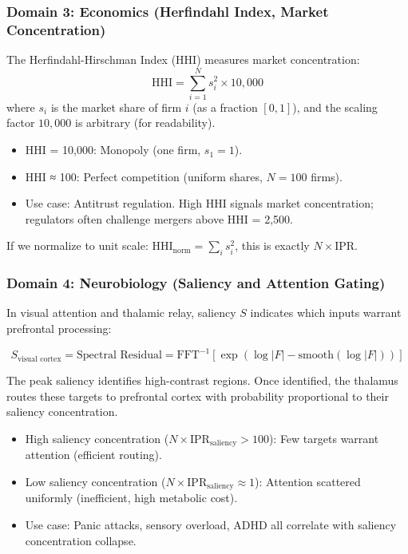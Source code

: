 \documentclass[11pt,oneside]{article}
\theoremstyle{definition}
\begin{document}
\subsubsection{Domain 3: Economics (Herfindahl Index, Market Concentration)}

The Herfindahl-Hirschman Index (HHI) measures market concentration:
\[
\text{HHI} = \sum_{i=1}^N s_i^2 \times 10,000
\]
where $s_i$ is the market share of firm $i$ (as a fraction $[0, 1]$), and the scaling factor $10,000$ is arbitrary (for readability).

\begin{itemize}
  \item HHI = 10,000: Monopoly (one firm, $s_1 = 1$).
  \item HHI ≈ 100: Perfect competition (uniform shares, $N = 100$ firms).
  \item Use case: Antitrust regulation. High HHI signals market concentration; regulators often challenge mergers above HHI = 2,500.
\end{itemize}

If we normalize to unit scale: $\text{HHI}_{\text{norm}} = \sum_i s_i^2$, this is exactly $N \times \text{IPR}$.

\subsubsection{Domain 4: Neurobiology (Saliency and Attention Gating)}

In visual attention and thalamic relay, saliency $S$ indicates which inputs warrant prefrontal processing:

\[
S_{\text{visual cortex}} = \text{Spectral Residual} = \text{FFT}^{-1}\left[\exp(\log|F| - \text{smooth}(\log|F|))\right]
\]

The peak saliency identifies high-contrast regions. Once identified, the thalamus routes these targets to prefrontal cortex with probability proportional to their saliency concentration.

\begin{itemize}
  \item High saliency concentration ($N \times \text{IPR}_{\text{saliency}} > 100$): Few targets warrant attention (efficient routing).
  \item Low saliency concentration ($N \times \text{IPR}_{\text{saliency}} \approx 1$): Attention scattered uniformly (inefficient, high metabolic cost).
  \item Use case: Panic attacks, sensory overload, ADHD all correlate with saliency concentration collapse.
\end{itemize}
\end{document}
